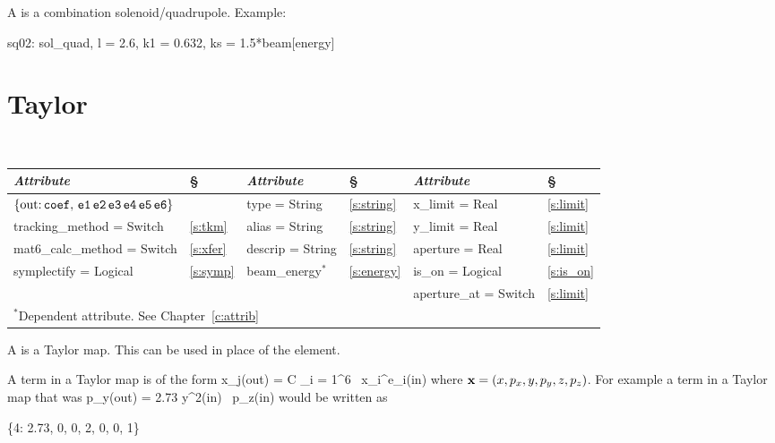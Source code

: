 {{A  is a combination solenoid/quadrupole.
Example:
\begin{example}
  sq02: sol_quad, l = 2.6, k1 = 0.632, ks = 1.5*beam[energy]
\end{example}

\section{Taylor}
\label{s:tay}

\begin{center}
\tt
\begin{tabular}{|l|l||l|l||l|l|} \hline
  {\sl Attribute} & \S  & {\sl Attribute} & \S & {\sl Attribute} & \S \\ \hline
  $\{ \tt \mbox{out:}\,  coef, \, e1 \, e2 \, e3 \, e4 \, e5 \, e6 \}$ 
                              &              & type = String    & \ref{s:string} & x\_limit = Real       & \ref{s:limit} \\ \hline  
  tracking\_method = Switch   & \ref{s:tkm}  & alias = String   & \ref{s:string} & y\_limit = Real       & \ref{s:limit} \\ \hline
  mat6\_calc\_method = Switch & \ref{s:xfer} & descrip = String & \ref{s:string} & aperture = Real       & \ref{s:limit} \\ \hline
  symplectify = Logical       & \ref{s:symp} & beam\_energy$^*$ & \ref{s:energy} & is\_on = Logical      & \ref{s:is_on} \\ \hline
                              &              &                  &                & aperture\_at = Switch & \ref{s:limit} \\ \hline
  \multicolumn{6}{l}{\small $^*$Dependent attribute. See Chapter~\ref{c:attrib}} \\
\end{tabular}
\end{center}
\toffset

A  is a Taylor map. This can be used in place of the \mad 
{} element.

A term in a Taylor map is of the form
\Begineq
  x_j({\rm out}) = C \cdot \Pi_{i = 1}^6 \, x_i^{e_i}({\rm in})
\Endeq
where ${\bf x} = (x, p_x, y, p_y, z, p_z)$. For example a term
in a Taylor map that was
\Begineq
  p_y({\rm out}) = 2.73 \cdot y^2({\rm in}) \, p_z({\rm in})
\Endeq
would be written as
\begin{example}
  \{4: 2.73, 0, 0, 2, 0, 0, 1\}
\end{example}

}}
